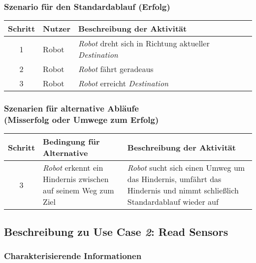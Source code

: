 \documentclass[includeheaders]{scrartcl}
\begin{document}
			\subsubsection*{Szenario für den Standardablauf (Erfolg)}

			\begin{table}[H]
				\centering
				\begin{tabularx}{\textwidth}{@{}cp{2cm}X@{}}
				\toprule
				Schritt & Nutzer & Beschreibung der Aktivität \\ \midrule
				1 & Robot & \emph{Robot} dreht sich in Richtung aktueller \emph{Destination} \\
				2 & Robot & \emph{Robot} fährt geradeaus \\
				3 & Robot & \emph{Robot} erreicht \emph{Destination} \\
				\bottomrule
				\end{tabularx}
			\end{table}

			\subsubsection*{Szenarien für alternative Abläufe\\ (Misserfolg oder Umwege zum Erfolg)}

			\begin{table}[H]
				\centering
				\begin{tabularx}{\textwidth}{@{}cp{6cm}X@{}}
				\toprule
				Schritt & Bedingung für Alternative & Beschreibung der Aktivität \\ \midrule
				3 & \emph{Robot} erkennt ein Hindernis zwischen auf seinem Weg zum Ziel & \emph{Robot} sucht sich einen Umweg um das Hindernis, umfährt das Hindernis und nimmt schließlich Standardablauf wieder auf \\
				\bottomrule
				\end{tabularx}
			\end{table}


		\subsection{Beschreibung zu Use Case \emph{2}: Read Sensors}

			\subsubsection*{Charakterisierende Informationen}
\end{document}
